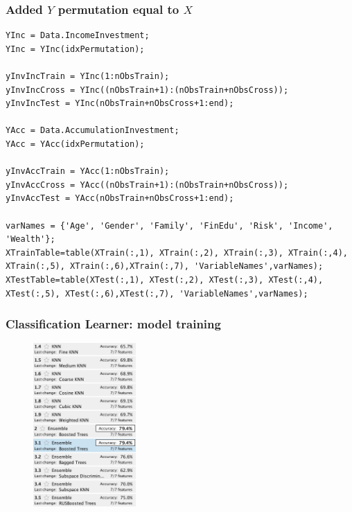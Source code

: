 \documentclass{beamer}
\begin{document}
\begin{frame}[fragile]
\frametitle{Added $Y$ permutation equal to $X$}
\tiny
\begin{verbatim}
YInc = Data.IncomeInvestment;
YInc = YInc(idxPermutation);

yInvIncTrain = YInc(1:nObsTrain);
yInvIncCross = YInc((nObsTrain+1):(nObsTrain+nObsCross));
yInvIncTest = YInc(nObsTrain+nObsCross+1:end);

YAcc = Data.AccumulationInvestment;
YAcc = YAcc(idxPermutation);

yInvAccTrain = YAcc(1:nObsTrain);
yInvAccCross = YAcc((nObsTrain+1):(nObsTrain+nObsCross));
yInvAccTest = YAcc(nObsTrain+nObsCross+1:end);

varNames = {'Age', 'Gender', 'Family', 'FinEdu', 'Risk', 'Income', 'Wealth'};
XTrainTable=table(XTrain(:,1), XTrain(:,2), XTrain(:,3), XTrain(:,4),
XTrain(:,5), XTrain(:,6),XTrain(:,7), 'VariableNames',varNames);
XTestTable=table(XTest(:,1), XTest(:,2), XTest(:,3), XTest(:,4),
XTest(:,5), XTest(:,6),XTest(:,7), 'VariableNames',varNames);
\end{verbatim}
\end{frame}


\begin{frame}
    \frametitle{Classification Learner: model training}
    \begin{figure}
    	\centering
    	\includegraphics[width=0.35\textwidth]{modelstrained}
    \end{figure}
\end{frame}
\end{document}
